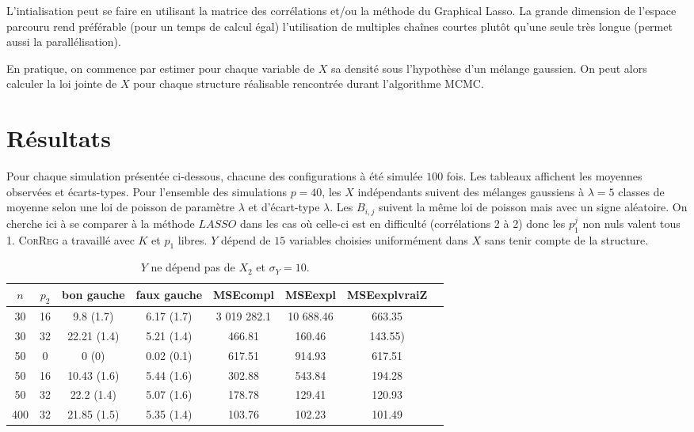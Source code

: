 \documentclass[12pt]{article}
\begin{document}
L'intialisation peut se faire en utilisant la matrice des corrélations et/ou la méthode du Graphical Lasso\cite{friedman2008sparse}.		
La grande dimension de l'espace parcouru rend préférable  (pour un temps de calcul égal) l'utilisation de multiples chaînes courtes plutôt qu'une seule très longue (permet aussi la parallélisation).
	
	En pratique, on commence par estimer pour chaque variable de $X$ sa densité sous l'hypothèse d'un mélange gaussien. On peut alors calculer la loi jointe de $X$ pour chaque structure réalisable rencontrée durant l'algorithme MCMC.
\section{Résultats}	
Pour chaque simulation présentée ci-dessous, chacune des configurations à été simulée $100$ fois. Les tableaux affichent les moyennes observées et écarts-types. Pour l'ensemble des simulations $p=40$, les $X$ indépendants suivent des mélanges gaussiens à $\lambda=5$ classes de moyenne selon une loi de poisson de paramètre $\lambda$ et d'écart-type $\lambda$. Les $B_{i,j}$ suivent la même loi de poisson mais avec un signe aléatoire. On cherche ici à se comparer à la méthode $LASSO$ dans les cas où celle-ci est en difficulté (corrélations 2 à 2) donc les $p_1^j$ non nuls valent tous 1. \textsc{CorReg}  a  travaillé avec $K$ et $p_1$ libres. $Y$ dépend de $15$ variables choisies uniformément dans $X$ sans tenir compte de la structure.

\begin{table}
\centering
\begin{tabular}{|c|c|c|c|c|c|c|c|}
\hline 
$n$ & $p_2$ & bon gauche & faux gauche    & MSEcompl  &    MSEexpl & MSEexplvraiZ\\ 
\hline 
30 & 16 &  9.8 (1.7) & 6.17 (1.7) & 3 019 282.1 & 10 688.46  & 663.35\\ 
\hline 
30 & 32 &22.21 (1.4) & 5.21 (1.4) & 466.81  & 160.46  & 143.55) \\ 
\hline 
\hline 
50 & 0 & 0 (0) & 0.02 (0.1) & 617.51  & 914.93  & 617.51 \\ 
\hline 
50 & 16 & 10.43 (1.6) & 5.44 (1.6) & 302.88  & 543.84  & 194.28 \\ 
\hline 
50 & 32 & 22.2 (1.4) & 5.07 (1.6) & 178.78 & 129.41  & 120.93 \\ 
\hline \hline
400 & 32 &21.85 (1.5) & 5.35 (1.4) & 103.76  & 102.23  & 101.49 \\ 
\hline 
\end{tabular} 
\caption{$Y$ ne dépend pas de $X_2$ et $\sigma_Y=10$.} \label{tableMSEsimp20}
\end{table}
\end{document}
